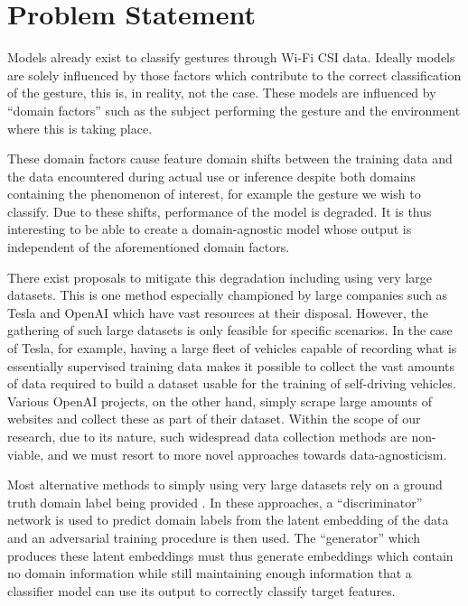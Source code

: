 \section{Problem Statement}\label{sec:intro-problem-statement}
Models already exist to classify gestures through Wi-Fi CSI data.
Ideally models are solely influenced by those factors which contribute to the correct classification of the gesture, this is, in reality, not the case.
These models are influenced by ``domain factors'' such as the subject performing the gesture and the environment where this is taking place.

These domain factors cause feature domain shifts between the training data and the data encountered during actual use or inference despite both domains containing the phenomenon of interest, for example the gesture we wish to classify.
Due to these shifts, performance of the model is degraded. 
It is thus interesting to be able to create a domain-agnostic model whose output is independent of the aforementioned domain factors.

There exist proposals to mitigate this degradation including using very large datasets.
This is one method especially championed by large companies such as Tesla and OpenAI which have vast resources at their disposal.
However, the gathering of such large datasets is only feasible for specific scenarios.
In the case of Tesla, for example, having a large fleet of vehicles capable of recording what is essentially supervised training data makes it possible to collect the vast amounts of data required to build a dataset usable for the training of self-driving vehicles.
Various OpenAI projects, on the other hand, simply scrape large amounts of websites and collect these as part of their dataset.
Within the scope of our research, due to its nature, such widespread data collection methods are non-viable, and we must resort to more novel approaches towards data-agnosticism.

Most alternative methods to simply using very large datasets rely on a ground truth domain label being provided \cite{jiang2018towards,xue2020deepmv}.
In these approaches, a ``discriminator'' network is used to predict domain labels from the latent embedding of the data and an adversarial training procedure is then used.
The ``generator'' which produces these latent embeddings must thus generate embeddings which contain no domain information while still maintaining enough information that a classifier model can use its output to correctly classify target features.

